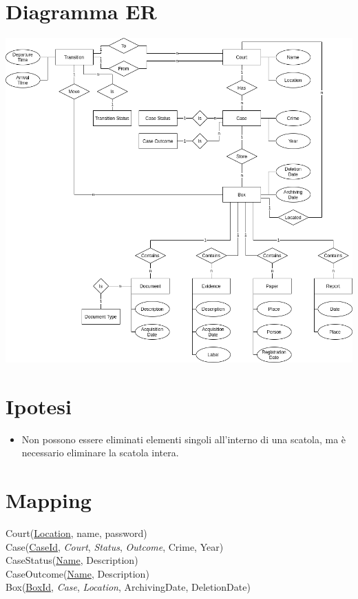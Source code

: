 \documentclass{article}
\begin{document}
\section{Diagramma ER}

\begin{adjustwidth}{-50cm}{-50cm}
    \vspace{\fill}
    \begin{center}
        \includegraphics[scale=0.50]{../images/er.png}
    \end{center}
    \vspace{\fill}
\end{adjustwidth}

\newpage
\section{Ipotesi}

\begin{itemize}
    \item Non possono essere eliminati elementi singoli all'interno di una scatola, ma è necessario eliminare la scatola intera.
\end{itemize}

\section{Mapping}

Court(\underline{Location}, name, password) \\
Case(\underline{CaseId}, \textit{Court}, \textit{Status}, \textit{Outcome}, Crime, Year) \\
CaseStatus(\underline{Name}, Description) \\
CaseOutcome(\underline{Name}, Description) \\
Box(\underline{BoxId}, \textit{Case}, \textit{Location}, ArchivingDate, DeletionDate)
\end{document}
